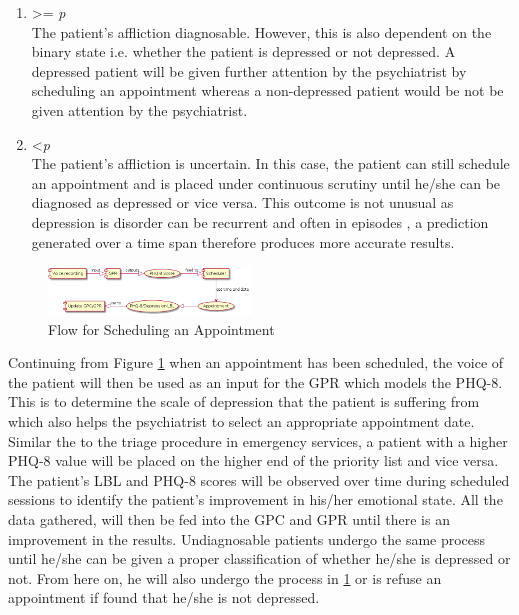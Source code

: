 \documentclass{article}
\begin{document}
	\begin{enumerate}
		\item {\textgreater= \emph{p}} \\
		The patient's affliction diagnosable.
		However, this is also dependent on the binary state i.e. whether the patient is depressed or not depressed. 
		A depressed patient will be given further attention by the psychiatrist by scheduling an appointment whereas a non-depressed patient would be not be given attention by the psychiatrist.
		\item {\textless \emph{p}} \\
		The patient's affliction is uncertain. 
		In this case, the patient can still schedule an appointment and is placed under continuous scrutiny until he/she can be diagnosed as depressed or vice versa.
		This outcome is not unusual as depression is disorder can be recurrent and often in episodes \cite{bp6152013}, a prediction generated over a time span therefore produces more accurate results.\\
	\end{enumerate}
	
	\begin{figure}[h]
 		\begin{center}
		\includegraphics[width=0.48\textwidth]{appointment} 
  		\end{center}
  		\caption{Flow for Scheduling an Appointment}
  		\label{sch_app} 
 	\end{figure}

	Continuing from Figure \ref{sch_app} when an appointment has been scheduled, the voice of the patient will then be used as an input for the GPR which models the PHQ-8. 
	This is to determine the scale of depression that the patient is suffering from which also helps the psychiatrist to select an appropriate appointment date. 		
	Similar the to the triage procedure in emergency services, a patient with a higher PHQ-8 value will be placed on the higher end of the priority list and vice versa.
	The patient's LBL and PHQ-8 scores will be observed over time during scheduled sessions to identify the patient's improvement in his/her emotional state.
	All the data gathered, will then be fed into the GPC and GPR until there is an improvement in the results.
	Undiagnosable patients undergo the same process until he/she can be given a proper classification of whether he/she is depressed or not.
	From here on, he will also undergo the process in \ref{sch_app} or is refuse an appointment if found that he/she is not depressed.
\end{document}
